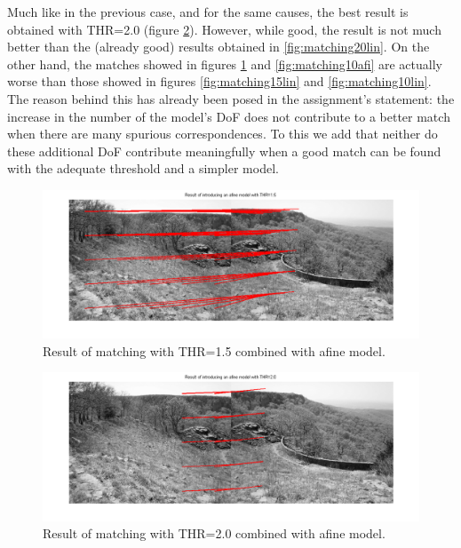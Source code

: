 Much like in the previous case, and for the same causes, the best result is obtained
with THR=2.0 (figure \ref{fig:matching20afi}). However, while good, the result is
not much better than the (already good) results obtained in \ref{fig:matching20lin}.
On the other hand, the matches showed in figures \ref{fig:matching15afi} and \ref{fig:matching10afi}
are actually worse than those showed in figures \ref{fig:matching15lin} and
\ref{fig:matching10lin}. The reason behind this has already been posed in
the assignment's statement: the increase in the number of the model's DoF does not contribute
to a better match when there are many spurious correspondences. To this we add that
neither do these additional DoF contribute meaningfully when a good match can be found
with the adequate threshold and a simpler model.

\begin{figure}[htb]
	\centering
		\includegraphics[width=\textwidth]{./img/ex1/matching_15_afine.png}
	\caption{Result of matching with THR=1.5 combined with afine model.}
	\label{fig:matching15afi}
\end{figure}

\begin{figure}[htb]
	\centering
		\includegraphics[width=\textwidth]{./img/ex1/matching_20_afine.png}
	\caption{Result of matching with THR=2.0 combined with afine model.}
	\label{fig:matching20afi}
\end{figure}

